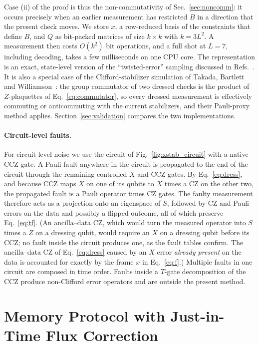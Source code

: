 \documentclass[a4paper]{article}
\begin{document}
Case (ii) of the proof is thus the non-commutativity of Sec.~\ref{sec:noncomm}: it occurs precisely when an earlier measurement has restricted $B$ in a direction that the present check moves. We store $x$, a row-reduced basis of the constraints that define $B$, and $Q$ as bit-packed matrices of size $k\times k$ with $k=3L^2$. A measurement then costs $O(k^2)$ bit operations, and a full shot at $L=7$, including decoding, takes a few milliseconds on one CPU core. The representation is an exact, state-level version of the ``twisted-error'' sampling discussed in Refs.~\cite{davydova2025knots,magdalena2026}. It is also a special case of the Clifford-stabilizer simulation of Takada, Bartlett and Williamson~\cite{takada2026exact}: the group commutator of two dressed checks is the product of $Z$-plaquettes of Eq.~\eqref{eq:commutator}, so every dressed measurement is effectively commuting or anticommuting with the current stabilizers, and their Pauli-proxy method applies. Section~\ref{sec:validation} compares the two implementations.

\paragraph{Circuit-level faults.}
For circuit-level noise we use the circuit of Fig.~\ref{fig:xstab_circuit} with a native CCZ gate. A Pauli fault anywhere in the circuit is propagated to the end of the circuit through the remaining controlled-$X$ and CCZ gates. By Eq.~\eqref{eq:dress}, and because $\mathrm{CCZ}$ maps $X$ on one of its qubits to $X$ times a CZ on the other two, the propagated fault is a Pauli operator times CZ gates. The faulty measurement therefore acts as a projection onto an eigenspace of $S$, followed by CZ and Pauli errors on the data and possibly a flipped outcome, all of which preserve Eq.~\eqref{eq:tf}. (An ancilla--data CZ, which would turn the measured operator into $S$ times a $Z$ on a dressing qubit, would require an $X$ on a dressing qubit before its CCZ; no fault inside the circuit produces one, as the fault tables confirm. The ancilla--data CZ of Eq.~\eqref{eq:dress} caused by an $X$ error \emph{already present} on the data is accounted for exactly by the frame $x$ in Eq.~\eqref{eq:f}.) Multiple faults in one circuit are composed in time order. Faults inside a $T$-gate decomposition of the CCZ produce non-Clifford error operators and are outside the present method.

\section{Memory Protocol with Just-in-Time Flux Correction}
\label{sec:protocol}
\end{document}
